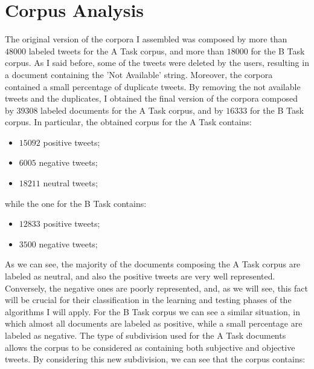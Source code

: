 \documentclass[11pt,twocolumn]{article}
\begin{document}
    \section{Corpus Analysis} %
    \label{sec:corpus_analysis}
        The original version of the corpora I assembled was composed by more than $48000$ labeled tweets for the
        A Task corpus, and more than $18000$ for the B Task corpus. As I said before, some of the tweets were
        deleted by the users, resulting in a document containing the 'Not Available' string. Moreover, the
        corpora contained a small percentage of duplicate tweets. By removing the not available tweets and the
        duplicates, I obtained the final version of the corpora composed by $39308$ labeled documents for the
        A Task corpus, and by $16333$ for the B Task corpus. In particular, the obtained corpus for the A Task
        contains:

        \begin{itemize}
            \item $15092$ positive tweets;
            \item $6005$ negative tweets;
            \item $18211$ neutral tweets;
        \end{itemize}

        while the one for the B Task contains:

        \begin{itemize}
            \item $12833$ positive tweets;
            \item $3500$ negative tweets;
        \end{itemize}

        \noindent
        As we can see, the majority of the documents composing the A Task corpus are labeled as neutral, and also
        the positive tweets are very well represented. Conversely, the negative ones are poorly
        represented, and, as we will see, this fact will be crucial for their classification in the
        learning and testing phases of the algorithms I will apply. For the B Task corpus we can see a similar
        situation, in which almost all documents are labeled as positive, while a small percentage are labeled as
        negative. The type of subdivision used for the A Task documents allows the corpus to be considered as
        containing both subjective and objective tweets. By considering this new subdivision, we can see that the
        corpus contains:
\end{document}
